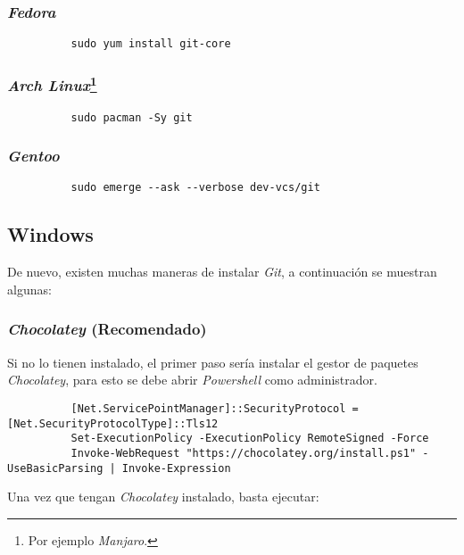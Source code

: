      \subsubsection{\textit{Fedora}}
        \begin{verbatim}
          sudo yum install git-core
        \end{verbatim}

      \subsubsection{\textit{Arch Linux}\footnote{Por ejemplo \textit{Manjaro}.}}
        \begin{verbatim}
          sudo pacman -Sy git
        \end{verbatim}

      \subsubsection{\textit{Gentoo}}
        \begin{verbatim}
          sudo emerge --ask --verbose dev-vcs/git
        \end{verbatim}

    \subsection{Windows}
      De nuevo, existen muchas maneras de instalar \textit{Git}, a continuación se 
      muestran algunas:

      \subsubsection{\textit{Chocolatey} (Recomendado)}
        Si no lo tienen instalado, el primer paso sería instalar el gestor de paquetes 
        \textit{Chocolatey}, para esto se debe abrir \textit{Powershell} como 
        administrador.

        \begin{verbatim}
          [Net.ServicePointManager]::SecurityProtocol = [Net.SecurityProtocolType]::Tls12
          Set-ExecutionPolicy -ExecutionPolicy RemoteSigned -Force
          Invoke-WebRequest "https://chocolatey.org/install.ps1" -UseBasicParsing | Invoke-Expression
        \end{verbatim}

        Una vez que tengan \textit{Chocolatey} instalado, basta ejecutar:

